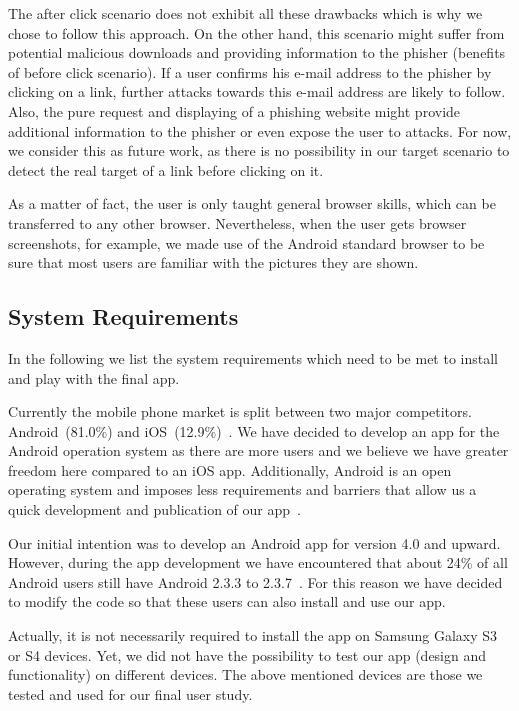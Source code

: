 \begin{description}[leftmargin=0cm]
The after click scenario does not exhibit all these drawbacks which is why we chose to follow this approach.
On the other hand, this scenario might suffer from potential malicious downloads and providing information to the phisher (benefits of before click scenario).
If a user confirms his e-mail address to the phisher by clicking on a link, further attacks towards this e-mail address are likely to follow.
Also, the pure request and displaying of a phishing website might provide additional information to the phisher or even expose the user to attacks.
For now, we consider this as future work, as there is no possibility in our target scenario to detect the real target of a link before clicking on it.

	\item[Considered Browser] As a matter of fact, the user is only taught general browser skills, which can be transferred to any other browser.
Nevertheless, when the user gets browser screenshots, for example, we made use of the Android standard browser to be sure that most users are familiar with the pictures they are shown.
\end{description}	

\subsection{System Requirements}
In the following we list the system requirements which need to be met to install and play with the final app.


\begin{description}[leftmargin=0cm]
	\item[Android] Currently the mobile phone market is split between two major competitors. Android~(81.0\%) and iOS~(12.9\%)~\cite{androidiosmarketshare}. 
	We have decided to develop an app for the Android operation system as there are more users and we believe we have greater freedom here compared to an iOS app. 
 	Additionally, Android is an open operating system and imposes less requirements and barriers that allow us a quick development and publication of our app~\cite{publishios, publishandroid}. 
	\item[Version] Our initial intention was to develop an Android app for version 4.0 and upward.
 However, during the app development we have encountered that about 24\% of all Android users still have Android 2.3.3 to 2.3.7~\cite{versionsandroid}. For this reason we have decided to modify the code so that these users can also install and use our app.
	\item[Samsung Galaxy S3 or S4] Actually, it is not necessarily required to install the app on Samsung Galaxy S3 or S4 devices. 
Yet, we did not have the possibility to test our app (design and functionality) on different devices.
The above mentioned devices are those we tested and used for our final user study.
\end{description}

